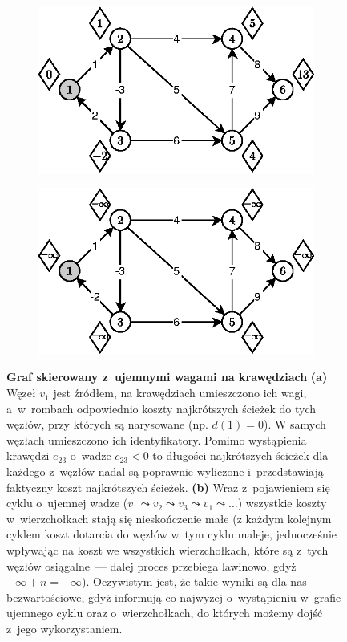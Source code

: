 \begin{figure}[!htbp]
	\centering
	\begin{subfigure}[b]{0.45\textwidth}
		\includegraphics[width=\textwidth]{Chapter_I/8/1_8a.eps}
		\caption{}
	\end{subfigure}%
	\qquad
	\begin{subfigure}[b]{0.45\textwidth}
		\includegraphics[width=\textwidth]{Chapter_I/8/1_8b.eps}
		\caption{}
	\end{subfigure}
	\caption{\textbf{Graf skierowany z~ujemnymi wagami na krawędziach} \textbf{(a)} Węzeł $v_{1}$ jest źródłem, na krawędziach umieszczono ich wagi, a~w~rombach odpowiednio koszty najkrótszych ścieżek do tych węzłów, przy których są narysowane (np. $d \left( 1 \right) = 0$). W samych węzłach umieszczono ich identyfikatory. Pomimo wystąpienia krawędzi $e_{23}$ o~wadze $c_{23} < 0$ to długości najkrótszych ścieżek dla każdego z~węzłów nadal są poprawnie wyliczone i~przedstawiają faktyczny koszt najkrótszych ścieżek. \textbf{(b)} Wraz z~pojawieniem się cyklu o~ujemnej wadze ($v_{1} \leadsto v_{2} \leadsto v_{3} \leadsto v_{1} \leadsto \ldots$) wszystkie koszty w~wierzchołkach stają się nieskończenie małe (z każdym kolejnym cyklem koszt dotarcia do węzłów w~tym cyklu maleje, jednocześnie wpływając na koszt we wszystkich wierzchołkach, które są z~tych węzłów osiągalne~---  dalej proces przebiega lawinowo, gdyż $- \infty + n = - \infty$). Oczywistym jest, że takie wyniki są dla nas bezwartościowe, gdyż informują co najwyżej o~wystąpieniu w~grafie ujemnego cyklu oraz o~wierzchołkach, do których możemy dojść z~jego wykorzystaniem.}\label{fig:negativeCycle}
\end{figure}

